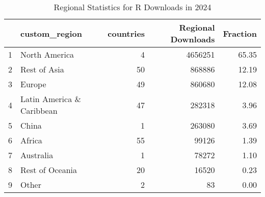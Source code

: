 \begin{table}[ht]
\centering
\begin{tabular}{rlrrr}
  \hline
 & custom\_region & countries & Regional Downloads & Fraction \\ 
  \hline
1 & North America &   4 & 4656251 & 65.35 \\ 
  2 & Rest of Asia &  50 & 868886 & 12.19 \\ 
  3 & Europe &  49 & 860680 & 12.08 \\ 
  4 & Latin America \& Caribbean &  47 & 282318 & 3.96 \\ 
  5 & China &   1 & 263080 & 3.69 \\ 
  6 & Africa &  55 & 99126 & 1.39 \\ 
  7 & Australia &   1 & 78272 & 1.10 \\ 
  8 & Rest of Oceania &  20 & 16520 & 0.23 \\ 
  9 & Other &   2 &  83 & 0.00 \\ 
   \hline
\end{tabular}
\caption{Regional Statistics for R Downloads in 2024} 
\label{tab:r_downloads_regional_stats_2024}
\end{table}
